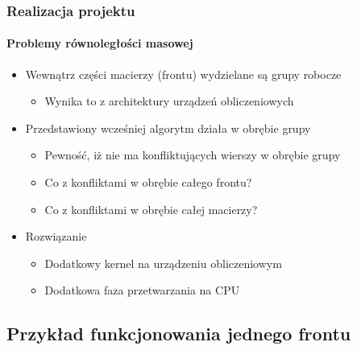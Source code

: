 \documentclass[12pt,handout]{beamer}
\begin{document}
\begin{frame}
\frametitle{Realizacja projektu}
\framesubtitle{Problemy równoległości masowej}
\begin{itemize}[<+->]
\item Wewnątrz części macierzy (frontu) wydzielane są grupy robocze
	\begin{itemize}
	\item Wynika to z architektury urządzeń obliczeniowych
	\end{itemize}
\item Przedstawiony wcześniej algorytm działa w obrębie grupy
	\begin{itemize}
	\item Pewność, iż nie ma konfliktujących wierszy w obrębie grupy
	\item Co z konfliktami w obrębie całego frontu?
	\item Co z konfliktami w obrębie całej macierzy?
	\end{itemize}
\item Rozwiązanie
	\begin{itemize}
	\item Dodatkowy kernel na urządzeniu obliczeniowym
	\item Dodatkowa faza przetwarzania na CPU
	\end{itemize}
\end{itemize}
\end{frame}

\subsection{Przykład funkcjonowania jednego frontu}
\end{document}
